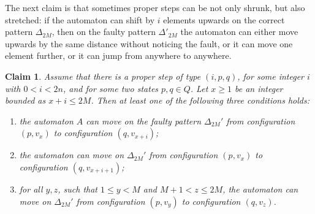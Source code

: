 \documentclass[12pt,a4paper]{article}
\newtheorem{claim}{Claim}
\theoremstyle{definition}
\begin{document}
The next claim is that sometimes proper steps can be not only shrunk,
but also stretched:
if the automaton can shift by $i$ elements upwards on the correct pattern $\Delta_{2M}$,
then on the faulty pattern $\Delta'_{2M}$
the automaton can either move upwards by the same distance without noticing the fault,
or it can move one element further,
or it can jump from anywhere to anywhere.

\begin{claim}\label{claim_stretched_moves}
Assume that there is a proper step of type $(i,p,q)$,
for some integer $i$ with $0 < i < 2n$, 
and for some two states $p,q \in Q$.
Let $x \geqslant 1$ be an integer bounded as $x+i \leqslant 2M$.
Then at least one of the following three conditions holds:
\begin{enumerate}\renewcommand{\theenumi}{\Roman{enumi}}
\item	\label{claim_stretched_moves__x_to_x_plus_i}
	the automaton $A$ can move on the faulty pattern $\Delta_{2M}'$ 
	from configuration $(p,v_x)$ to configuration $(q,v_{x+i})$;
\item	\label{claim_stretched_moves__x_to_x_plus_i_plus_1}
	the automaton can move on $\Delta_{2M}'$ 
	from configuration $(p,v_x)$ to configuration $(q,v_{x+i+1})$;
\item	\label{claim_stretched_moves__y_to_z}
	for all $y,z$, such that $1 \leqslant y < M$ and $M+1 < z \leqslant 2M$,
	the automaton can move
	on $\Delta_{2M}'$ from configuration $(p, v_y)$ to configuration $(q,v_z)$.
\end{enumerate}
\end{claim}
\end{document}
